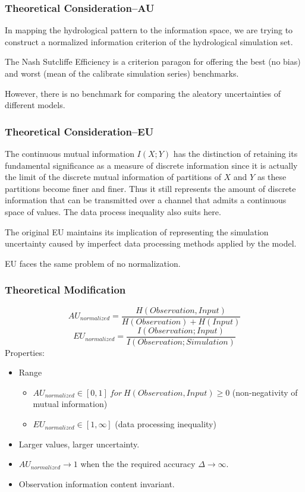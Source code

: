 \documentclass{beamer}
\begin{document}
\begin{CJK}{UTF8}{gkai}
\begin{frame}
\frametitle{Theoretical Consideration--AU}
In mapping the hydrological pattern to the information space, we are trying to construct a normalized information criterion of the hydrological simulation set.

The Nash Sutcliffe Efficiency is a criterion paragon  for offering the best (no bias) and worst (mean of the calibrate simulation series) benchmarks.

However, there is no benchmark for comparing the aleatory uncertainties of different models. 
\end{frame}

\begin{frame}
\frametitle{Theoretical Consideration--EU}
The continuous mutual information $I(X;Y)$ has the distinction of retaining its fundamental significance as a measure of discrete information since it is actually the limit of the discrete mutual information of partitions of $X$ and $Y$ as these partitions become finer and finer. Thus it still represents the amount of discrete information that can be transmitted over a channel that admits a continuous space of values. The data process inequality also suits here.

The original EU maintains its implication of representing the simulation uncertainty caused by imperfect data processing methods applied by the model.

EU faces the same problem of no normalization.
\end{frame}

\begin{frame}
\frametitle{Theoretical Modification}
\begin{equation*}
AU_{normalized}= \frac{H(Observation,Input)}{H(Observation)+H(Input)}
\end{equation*}
\begin{equation*}
EU_{normalized}=\frac{I(Observation;Input)}{I(Observation;Simulation)}
\end{equation*}
Properties:
\begin{itemize}
\item Range
\begin{itemize}
\item $AU_{normalized}\in [0,1] ~for~H(Observation,Input)\geq 0$ (non-negativity of mutual information)
\item $EU_{normalized}\in [1,\infty]$ (data processing inequality)
\end{itemize}
\item Larger values, larger uncertainty.
\item $AU_{normalized} \to 1$ when the the required accuracy $\Delta \to \infty$.
\item Observation information content invariant.
\end{itemize}
\end{frame}



\end{CJK}
\end{document}
